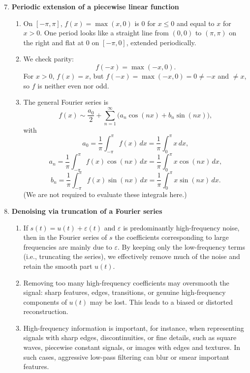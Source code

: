 \documentclass[11pt]{article}
\begin{document}
\begin{enumerate}
\setcounter{enumi}{6} %

\item \textbf{Periodic extension of a piecewise linear function}

\begin{enumerate}
\item On $[-\pi,\pi]$, $f(x)=\max(x,0)$ is $0$ for $x\le 0$ and equal to $x$ for $x>0$. One period looks like a straight line from $(0,0)$ to $(\pi,\pi)$ on the right and flat at $0$ on $[-\pi,0]$, extended periodically.

\item We check parity:
\[
f(-x)=\max(-x,0).
\]
For $x>0$, $f(x)=x$, but $f(-x)=\max(-x,0)=0\neq -x$ and $\neq x$, so $f$ is neither even nor odd.

\item The general Fourier series is
\[
f(x)\sim \frac{a_0}{2} + \sum_{n=1}^{\infty}\big(a_n\cos(nx)+b_n\sin(nx)\big),
\]
with
\[
a_0 = \frac{1}{\pi}\int_{-\pi}^{\pi} f(x)\,dx
     = \frac{1}{\pi}\int_{0}^{\pi} x\,dx,
\]
\[
a_n = \frac{1}{\pi}\int_{-\pi}^{\pi} f(x)\cos(nx)\,dx
     = \frac{1}{\pi}\int_{0}^{\pi} x\cos(nx)\,dx,
\]
\[
b_n = \frac{1}{\pi}\int_{-\pi}^{\pi} f(x)\sin(nx)\,dx
     = \frac{1}{\pi}\int_{0}^{\pi} x\sin(nx)\,dx.
\]
(We are not required to evaluate these integrals here.)
\end{enumerate}

\bigskip
\item \textbf{Denoising via truncation of a Fourier series}

\begin{enumerate}
\item If $s(t)=u(t)+\varepsilon(t)$ and $\varepsilon$ is predominantly high-frequency noise, then in the Fourier series of $s$ the coefficients corresponding to large frequencies are mainly due to $\varepsilon$. By keeping only the low-frequency terms (i.e., truncating the series), we effectively remove much of the noise and retain the smooth part $u(t)$.

\item Removing too many high-frequency coefficients may oversmooth the signal: sharp features, edges, transitions, or genuine high-frequency components of $u(t)$ may be lost. This leads to a biased or distorted reconstruction.

\item High-frequency information is important, for instance, when representing signals with sharp edges, discontinuities, or fine details, such as square waves, piecewise constant signals, or images with edges and textures. In such cases, aggressive low-pass filtering can blur or smear important features.
\end{enumerate}


\end{enumerate}
\end{document}
